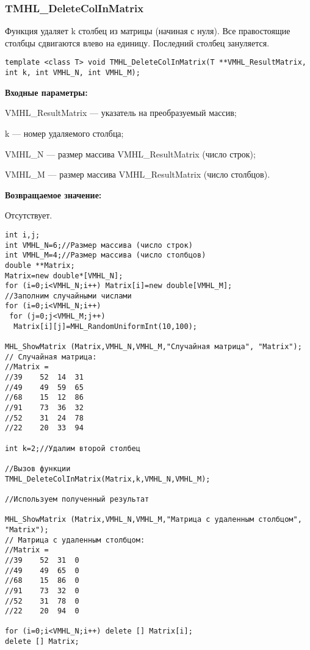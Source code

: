 \documentclass[a4paper,12pt]{article}
\begin{document}
\subsubsection{TMHL\_DeleteColInMatrix}\label{TMHL_DeleteColInMatrix}

Функция удаляет k столбец из матрицы (начиная с нуля). Все правостоящие столбцы сдвигаются влево  на единицу. Последний столбец зануляется.


\begin{lstlisting}[label=code_syntax_TMHL_DeleteColInMatrix,caption=Синтаксис]
template <class T> void TMHL_DeleteColInMatrix(T **VMHL_ResultMatrix, int k, int VMHL_N, int VMHL_M);
\end{lstlisting}

\textbf{Входные параметры:}  
 
VMHL\_ResultMatrix --- указатель на преобразуемый массив;
 
k --- номер удаляемого столбца;
 
VMHL\_N --- размер массива VMHL\_ResultMatrix (число строк);
 
VMHL\_M --- размер массива VMHL\_ResultMatrix (число столбцов).

\textbf{Возвращаемое значение:}

Отсутствует.


\begin{lstlisting}[label=code_use_TMHL_DeleteColInMatrix,caption=Пример использования]
int i,j;
int VMHL_N=6;//Размер массива (число строк)
int VMHL_M=4;//Размер массива (число столбцов)
double **Matrix;
Matrix=new double*[VMHL_N];
for (i=0;i<VMHL_N;i++) Matrix[i]=new double[VMHL_M];
//Заполним случайными числами
for (i=0;i<VMHL_N;i++)
 for (j=0;j<VMHL_M;j++)
  Matrix[i][j]=MHL_RandomUniformInt(10,100);

MHL_ShowMatrix (Matrix,VMHL_N,VMHL_M,"Случайная матрица", "Matrix");
// Случайная матрица:
//Matrix =
//39	52	14	31
//49	49	59	65
//68	15	12	86
//91	73	36	32
//52	31	24	78
//22	20	33	94

int k=2;//Удалим второй столбец

//Вызов функции
TMHL_DeleteColInMatrix(Matrix,k,VMHL_N,VMHL_M);

//Используем полученный результат

MHL_ShowMatrix (Matrix,VMHL_N,VMHL_M,"Матрица с удаленным столбцом", "Matrix");
// Матрица с удаленным столбцом:
//Matrix =
//39	52	31	0
//49	49	65	0
//68	15	86	0
//91	73	32	0
//52	31	78	0
//22	20	94	0

for (i=0;i<VMHL_N;i++) delete [] Matrix[i];
delete [] Matrix;
\end{lstlisting}
\end{document}
